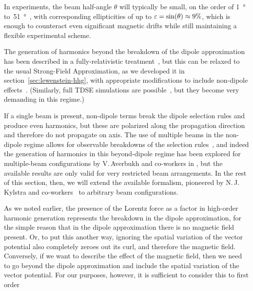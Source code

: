 In experiments, the beam half-angle $\theta$ will typically be small, on the order of \SI{1}{\degree} to~\SI{51}{\degree}~\cite{hickstein_non-collinear_2015}, with corresponding ellipticities of up to $\varepsilon=\sin(\theta)\approx 9\%$, which is enough to counteract even significant magnetic drifts while still maintaining a flexible experimental scheme. 

The generation of harmonics beyond the breakdown of the dipole approximation has been described in a fully-relativistic treatment~\cite{milosevic_qm-sfa-ultrahigh-hhg_2000, milosevic_relativistic_2002, milosevic_relativistic_2002-1}, but this can be relaxed to the usual Strong-Field Approximation, as we  developed it in section~\ref{sec:lewenstein-hhg}, with appropriate modifications to include non-dipole effects~\cite{ walser_hhg_2000, kylstra_photon_2001, kylstra_photon_2002, chirila_nondipole_2002, chirila_analysis_2004}. (Similarly, full TDSE simulations are possible~\cite{ meharg_beyond-dipole-tdse_2005}, but they become very demanding in this regime.)


If a single beam is present, non-dipole terms break the dipole selection rules and produce even harmonics, but these are polarized along the propagation direction and therefore do not propagate on axis. The use of multiple beams in the non-dipole regime allows for observable breakdowns of the selection rules~\cite{averbukh_stability_2002}, and indeed the generation of harmonics in this beyond-dipole regime has been explored for multiple-beam configurations by V.\,Averbukh and co-workers in , but the available results are only valid for very restricted beam arrangements. In the rest of this section, then, we will extend the available formalism, pioneered by N.\,J.\,Kylstra and co-workers~\cite{kylstra_photon_2001, kylstra_photon_2002, chirila_nondipole_2002, chirila_analysis_2004} to arbitrary beam configurations.




As we noted earlier, the presence of the Lorentz force as a factor in high-order harmonic generation represents the breakdown in the dipole approximation, for the simple reason that in the dipole approximation there is no magnetic field present. Or, to put this another way, ignoring the spatial variation of the vector potential also completely zeroes out its curl, and therefore the magnetic field. Conversely, if we want to describe the effect of the magnetic field, then we need to go beyond the dipole approximation and include the spatial variation of the vector potential. For our purposes, however, it is sufficient to consider this to first order 








